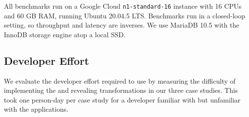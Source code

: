 %
%
%
%

All benchmarks run on a Google Cloud \texttt{n1-standard-16} instance with 16 CPUs
and 60 GB RAM, running Ubuntu 20.04.5 LTS. Benchmarks run in
a closed-loop setting, so throughput and latency are inverses. %
%
We use MariaDB 10.5 with the InnoDB storage engine atop a local SSD.
%

\subsection{\sys Developer Effort}
\label{s:eval-effort}

%
We evaluate the developer effort required to use \sys by measuring the
difficulty of implementing the \xxing and revealing transformations in our three
case studies.  This took one person-day per case study for a developer
familiar with \sys but unfamiliar with the applications.

